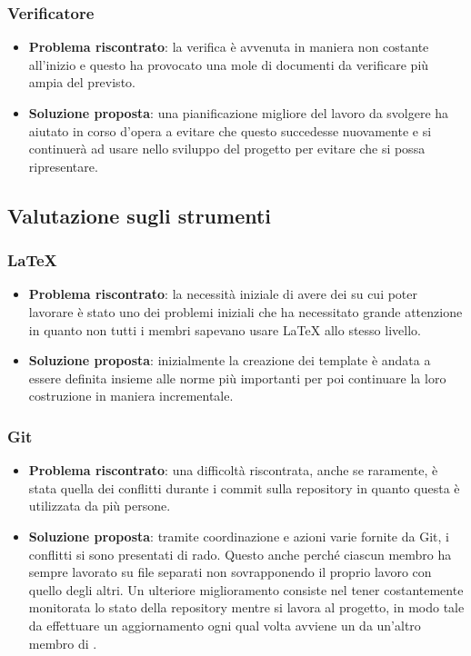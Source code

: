 		\subsubsection{Verificatore}
			\begin{itemize}
				\item \textbf{Problema riscontrato}: la verifica è avvenuta in maniera non costante all'inizio e questo ha provocato una mole di documenti da verificare più ampia del previsto.
				\item \textbf{Soluzione proposta}: una pianificazione migliore del lavoro da svolgere ha aiutato in corso d'opera a evitare che questo succedesse nuovamente e si continuerà ad usare nello sviluppo del progetto per evitare che si possa ripresentare.
			\end{itemize}

	\subsection{Valutazione sugli strumenti}

		\subsubsection{\LaTeX}
			\begin{itemize}
				\item \textbf{Problema riscontrato}: la necessità iniziale di avere dei  su cui poter lavorare è stato uno dei problemi iniziali che ha necessitato grande attenzione in quanto non tutti i membri sapevano usare {\LaTeX} allo stesso livello.
				\item \textbf{Soluzione proposta}: inizialmente la creazione dei template è andata a essere definita insieme alle norme più importanti per poi continuare la loro costruzione in maniera incrementale.
			\end{itemize}
		
		\subsubsection{Git}
			\begin{itemize}
				\item \textbf{Problema riscontrato}: una difficoltà riscontrata, anche se raramente, è stata quella dei conflitti durante i commit sulla repository in quanto questa è utilizzata da più persone.
				\item \textbf{Soluzione proposta}: tramite coordinazione e azioni varie fornite da Git, i conflitti si sono presentati di rado. Questo anche perché ciascun membro ha sempre lavorato su file separati non sovrapponendo il proprio lavoro con quello degli altri. Un ulteriore miglioramento consiste nel tener costantemente monitorata lo stato della repository mentre si lavora al progetto, in modo tale da effettuare un aggiornamento ogni qual volta avviene un  da un'altro membro di \gruppo. 
			\end{itemize}
		

